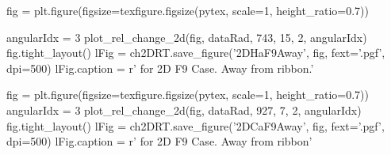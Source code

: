 
\begin{pycode}[2DRT]
fig = plt.figure(figsize=texfigure.figsize(pytex, scale=1, height_ratio=0.7))

angularIdx = 3
plot_rel_change_2d(fig, dataRad, 743, 15, 2, angularIdx)
fig.tight_layout()
lFig = ch2DRT.save_figure('2DHaF9Away', fig, fext='.pgf', dpi=500)
lFig.caption = r'\Ha{} for 2D F9 Case. Away from ribbon.'
\end{pycode}


\begin{pycode}[2DRT]
fig = plt.figure(figsize=texfigure.figsize(pytex, scale=1, height_ratio=0.7))
angularIdx = 3
plot_rel_change_2d(fig, dataRad, 927, 7, 2, angularIdx)
fig.tight_layout()
lFig = ch2DRT.save_figure('2DCaF9Away', fig, fext='.pgf', dpi=500)
lFig.caption = r'\CaLine{} for 2D F9 Case. Away from ribbon'
\end{pycode}



